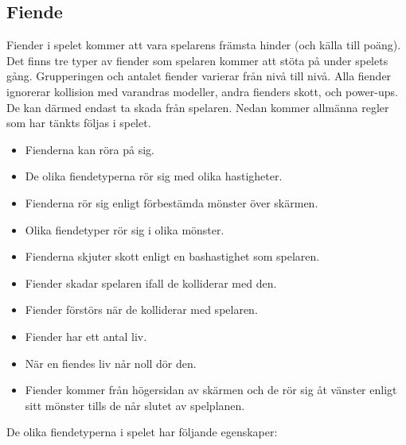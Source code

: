 \documentclass{TDP005mall}
\begin{document}
\subsection{Fiende}
Fiender i spelet kommer att vara spelarens främsta hinder (och källa till poäng). 
Det finns tre typer av fiender som spelaren kommer att stöta på under spelets gång. 
Grupperingen och antalet fiender varierar från nivå till nivå. 
Alla fiender ignorerar kollision med varandras modeller, andra fienders skott, och power-ups. De kan därmed endast ta skada från spelaren. 
Nedan kommer allmänna regler som har tänkts följas i spelet.

\begin{itemize}
\item Fienderna kan röra på sig.
\item De olika fiendetyperna rör sig med olika hastigheter.
\item Fienderna rör sig enligt förbestämda mönster över skärmen.
\item Olika fiendetyper rör sig i olika mönster.
\item Fienderna skjuter skott enligt en bashastighet som spelaren.
\item Fiender skadar spelaren ifall de kolliderar med den.
\item Fiender förstörs när de kolliderar med spelaren.
\item Fiender har ett antal liv. 
\item När en fiendes liv når noll dör den.
\item Fiender kommer från högersidan av skärmen och de rör sig åt vänster enligt sitt mönster tills de når slutet av spelplanen.
\end{itemize}

De olika fiendetyperna i spelet har följande egenskaper:
\end{document}
